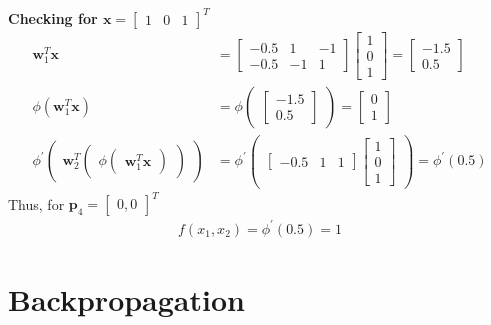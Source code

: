 \textbf{Checking for $\textbf{x} = \begin{bmatrix} 1 & 0 & 1 \end{bmatrix}^T$}
\begin{align*}
  \textbf{w}_1^T\textbf{x} &= \begin{bmatrix}
    -0.5 & 1 & -1 \\
    -0.5 & -1 & 1 
  \end{bmatrix} \begin{bmatrix}
    1\\
    0 \\
    1
  \end{bmatrix} = \begin{bmatrix}
    -1.5 \\
    0.5
  \end{bmatrix} \\
  \phi(\textbf{w}_1^T\textbf{x}) &= \phi\begin{pmatrix}
    \begin{bmatrix}
      -1.5 \\
      0.5
    \end{bmatrix}
  \end{pmatrix} = \begin{bmatrix}
    0 \\
    1
  \end{bmatrix} \\
  \phi^{'} \begin{pmatrix}
    \textbf{w}_2^T 
    \begin{pmatrix}
      \phi \begin{pmatrix}
        \textbf{w}_1^T\textbf{x}
    \end{pmatrix}  
  \end{pmatrix}
  \end{pmatrix} &= \phi^{'}\begin{pmatrix}
    \begin{bmatrix}
      -0.5 & 1 & 1
    \end{bmatrix} \begin{bmatrix}
      1 \\ 
      0 \\
      1
    \end{bmatrix}
  \end{pmatrix} = \phi^{'}(0.5)
\end{align*}
Thus, for $\textbf{p}_4 = \begin{bmatrix}
  0,0
\end{bmatrix}^T$
\begin{align*}
  f(x_1,x_2) = \phi^{'} (0.5) = 1
\end{align*}
\section{Backpropagation}